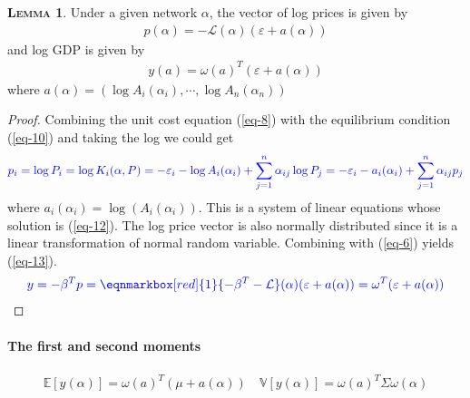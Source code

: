 \documentclass[11pt]{article}
\theoremstyle{definition}
\newtheorem{lemma}{\noindent \textbf{\textsc{Lemma}}}
\begin{document}
	\begin{lemma}
		Under a given network $\alpha$, the vector of log prices is given by
		\begin{align}
			p(\alpha) = -\mathcal{L}(\alpha)(\varepsilon + a(\alpha)) \label{eq-12}
		\end{align}
		and log GDP is given by
		\begin{align}
			y(a) = \omega (a)^T (\varepsilon + a(\alpha)) \label{eq-13}
		\end{align}
		where $a(\alpha) = (\log A_i(\alpha_i),\cdots, \log A_n(\alpha_n))$
	\end{lemma}
	\begin{proof}
		Combining the unit cost equation (\ref{eq-8}) with the equilibrium condition (\ref{eq-10}) and taking the log we could get
		\begin{align*}
			\color{blue} p_i = \log P_i = \log K_i(\alpha,P) = -\varepsilon_i - \log A_i(\alpha_i) + \sum\limits_{j=1}^n \alpha_{ij}\log P_j = -\varepsilon_i - a_i(\alpha_i) + \sum\limits_{j=1}^n \alpha_{ij} p_j
		\end{align*}
		where $a_i(\alpha_i) = \log(A_i(\alpha_i))$. This is a system of linear equations whose solution is (\ref{eq-12}). The log price vector is also normally distributed since it is a linear transformation of normal random variable. Combining with (\ref{eq-6}) yields (\ref{eq-13}).
		\begin{align*}
			\color{blue} y = -\beta^T p = \eqnmarkbox[red]{1}{-\beta^T -\mathcal{L}}(\alpha) (\varepsilon + a(\alpha)) = \omega^T (\varepsilon + a(\alpha))
		\end{align*}
	\end{proof}
	
	
	\paragraph{The first and second moments}
	\begin{align}
		\mathbb{E}[y(\alpha)] = \omega(a)^T (\mu + a(\alpha)) \quad \mathbb{V}[y(\alpha)] = \omega (a)^T \Sigma\omega(\alpha) \label{eq-14}
	\end{align}
	
\end{document}
